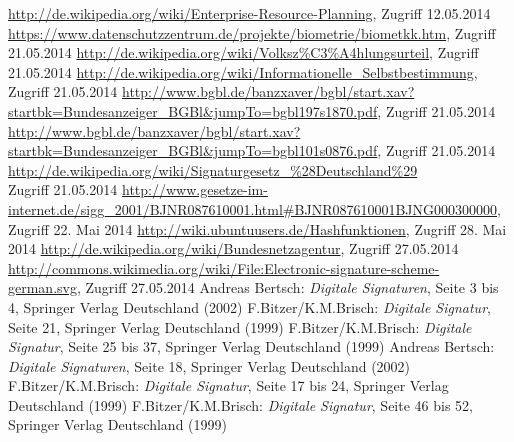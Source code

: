 \renewcommand{\refname}{}

\begin{thebibliography}{99}
   \small{\url{http://de.wikipedia.org/wiki/Enterprise-Resource-Planning}, Zugriff 12.05.2014}
   \small{ \url{https://www.datenschutzzentrum.de/projekte/biometrie/biometkk.htm}, Zugriff 21.05.2014}
   \small{ \url{http://de.wikipedia.org/wiki/Volksz\%C3\%A4hlungsurteil}, Zugriff 21.05.2014}
   \small{ \url{http://de.wikipedia.org/wiki/Informationelle_Selbstbestimmung}, Zugriff 21.05.2014}
   \small{ \url{http://www.bgbl.de/banzxaver/bgbl/start.xav?startbk=Bundesanzeiger_BGBl\&jumpTo=bgbl197s1870.pdf}, 
   Zugriff 21.05.2014}
   \small{ \url{http://www.bgbl.de/banzxaver/bgbl/start.xav?startbk=Bundesanzeiger_BGBl\&jumpTo=bgbl101s0876.pdf}, 
   Zugriff 21.05.2014}
   \small{ \url{http://de.wikipedia.org/wiki/Signaturgesetz_\%28Deutschland\%29}\\Zugriff 21.05.2014}
   \small{ \url{http://www.gesetze-im-internet.de/sigg_2001/BJNR087610001.html#BJNR087610001BJNG000300000}, 
   Zugriff 22. Mai 2014}
   \small{ \url{http://wiki.ubuntuusers.de/Hashfunktionen}, Zugriff 28. Mai 2014}
   \small{\url{http://de.wikipedia.org/wiki/Bundesnetzagentur}, Zugriff 27.05.2014}
   \small{\url{http://commons.wikimedia.org/wiki/File:Electronic-signature-scheme-german.svg}, Zugriff 27.05.2014}
   \small{Andreas Bertsch: \textit{Digitale Signaturen}, Seite 3 bis 4, Springer Verlag Deutschland (2002)}
   \small{F.Bitzer/K.M.Brisch: \textit{Digitale Signatur}, Seite 21, Springer Verlag Deutschland (1999)}
   \small{F.Bitzer/K.M.Brisch: \textit{Digitale Signatur}, Seite 25 bis 37, Springer Verlag Deutschland (1999)}
   \small{Andreas Bertsch: \textit{Digitale Signaturen}, Seite 18, Springer Verlag Deutschland (2002)}
   \small{F.Bitzer/K.M.Brisch: \textit{Digitale Signatur}, Seite 17 bis 24, Springer Verlag Deutschland (1999)}
   \small{F.Bitzer/K.M.Brisch: \textit{Digitale Signatur}, Seite 46 bis 52, Springer Verlag Deutschland (1999)}

\end{thebibliography}